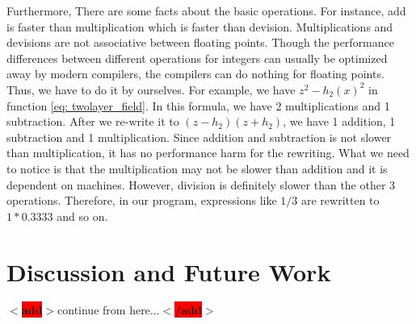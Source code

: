 \documentclass[12pt]{report}
\newcommand{\add}[1]{
  $<$\colorbox{red}{\textbf{add}}$>$#1$<$\colorbox{red}{\textbf{/add}}$>$
}
\begin{document}
          Furthermore, There are some facts about the basic operations. For instance, add is faster than 
          multiplication which is faster than devision. Multiplications and devisions are not associative
          between floating points. 
          Though the performance differences between different operations for integers can usually be optimized 
          away by modern compilers, the compilers can do nothing for floating points. Thus, we have to do it 
          by ourselves. For example, we have $z^2 - h_2\left(x\right)^2$ in function \ref{eq: twolayer_field}.
          In this formula, we have 2 multiplications and 1 subtraction. After we re-write it to 
          $\left(z-h_2\right)\left(z + h_2\right)$, we have 1 addition, 1 subtraction and 1 multiplication.
          Since addition and subtraction is not slower than multiplication, it has no performance harm 
          for the rewriting. What we need to notice is that the multiplication may not be slower than addition
          and it is dependent on machines. However, division is definitely slower than the other 3 operations. 
          Therefore, in our program, expressions like $1 / 3$ are rewritten to $1*0.3333$ and so on.  

      \chapter{Discussion and Future Work}
        \add{continue from here...}


        





          
\end{document}
